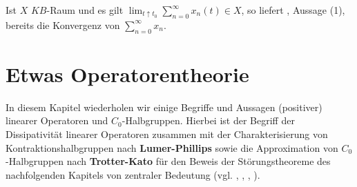 
\begin{bem}\label{Positive Folgen in $KB$-Raum}
Ist $X$  $KB$-Raum und es gilt $\lim_{t\uparrow t_0}\sum_{n=0}^\infty x_n(t)\in X$, so liefert , Aussage (1),  bereits die Konvergenz von $\sum_{n=0}^\infty x_n$.

\end{bem}


\chapter{Etwas Operatorentheorie}

In diesem Kapitel wiederholen wir einige Begriffe und Aussagen (positiver) linearer Operatoren und $C_0$-Halbgruppen. Hierbei ist der Begriff der Dissipativität linearer Operatoren zusammen mit der Charakterisierung von Kontraktionshalbgruppen nach \textbf{Lumer-Phillips} sowie die Approximation von $C_0$-Halbgruppen nach \textbf{Trotter-Kato} für den Beweis der Störungstheoreme des nachfolgenden Kapitels von zentraler Bedeutung (vgl. \cite{engel_nagel_2006}, \cite{werner_2007}, \cite{aliprantis_burkinshaw_2006}, \cite{pazy_1983}).

